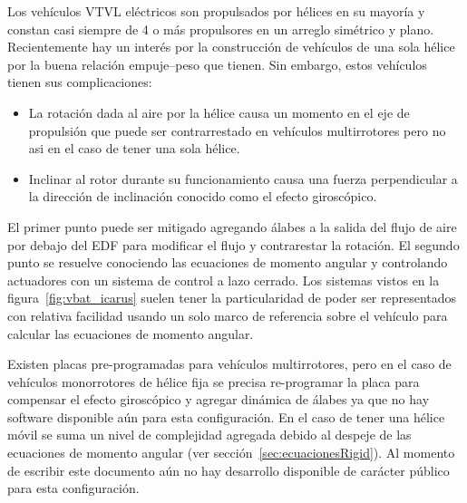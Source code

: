 Los vehículos VTVL eléctricos son propulsados por hélices en su mayoría y constan casi siempre de 4 o más propulsores en un arreglo simétrico y plano. Recientemente hay un interés por la construcción de vehículos de una sola hélice por la buena relación empuje--peso que tienen. Sin embargo, estos vehículos tienen sus complicaciones: 

\begin{itemize}
    \item La rotación dada al aire por la hélice causa un momento en el eje de propulsión que puede ser contrarrestado en vehículos multirrotores pero no asi en el caso de tener una sola hélice.
    \item Inclinar al rotor durante su funcionamiento causa una fuerza perpendicular a la dirección de inclinación conocido como el efecto giroscópico. 
\end{itemize}

El primer punto puede ser mitigado agregando álabes a la salida del flujo de aire por debajo del EDF para modificar el flujo y contrarestar la rotación. El segundo punto se resuelve conociendo las ecuaciones de momento angular y controlando actuadores con un sistema de control a lazo cerrado. Los sistemas vistos en la figura~\ref{fig:vbat_icarus} suelen tener la particularidad de poder ser representados con relativa facilidad usando un solo marco de referencia sobre el vehículo para calcular las ecuaciones de momento angular.

\medskip

Existen placas pre-programadas para vehículos multirrotores, pero en el caso de vehículos monorrotores de hélice fija se precisa re-programar la placa para compensar el efecto giroscópico y agregar dinámica de álabes ya que no hay software disponible aún para esta configuración. En el caso de tener una hélice móvil se suma un nivel de complejidad agregada debido al despeje de las ecuaciones de momento angular (ver sección~\ref{sec:ecuacionesRigid}). Al momento de escribir este documento aún no hay desarrollo disponible de carácter público para esta configuración.